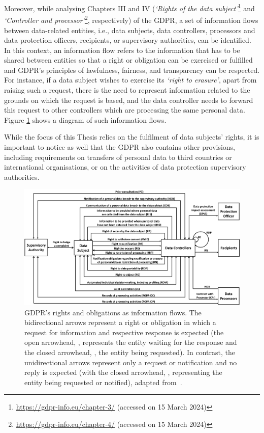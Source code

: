 Moreover, while analysing Chapters III and IV (\textit{`Rights of the data subject'}\footnote{\url{https://gdpr-info.eu/chapter-3/} (accessed on 15 March 2024)} and \textit{`Controller and processor'}\footnote{\url{https://gdpr-info.eu/chapter-4/} (accessed on 15 March 2024)}, respectively) of the GDPR, a set of information flows between data-related entities, i.e., data subjects, data controllers, processors and data protection officers, recipients, or supervisory authorities, can be identified.
In this context, an information flow refers to the information that has to be shared between entities so that a right or obligation can be exercised or fulfilled and GDPR's principles of lawfulness, fairness, and transparency can be respected.
For instance, if a data subject wishes to exercise its \textit{`right to erasure'}, apart from raising such a request, there is the need to represent information related to the grounds on which the request is based, and the data controller needs to forward this request to other controllers which are processing the same personal data.
Figure \ref{fig:gdpr_information_flows} shows a diagram of such information flows.

While the focus of this Thesis relies on the fulfilment of data subjects' rights, it is important to notice as well that the GDPR also contains other provisions, including requirements on transfers of personal data to third countries or international organisations, or on the activities of data protection supervisory authorities.

\begin{landscape}
\begin{figure}
    \centering
    \includegraphics[width=\linewidth]{figures/chapter-1/information flow diagram.png}
    \caption[GDPR's rights and obligations as information flows.]{GDPR's rights and obligations as information flows. The bidirectional arrows represent a right or obligation in which a request for information and respective response is expected (the open arrowhead, , represents the entity waiting for the response and the closed arrowhead, , the entity being requested). In contrast, the unidirectional arrows represent only a request or notification and no reply is expected (with the closed arrowhead, , representing the entity being requested or notified), adapted from~\cite{esteves_analysis_2022}.}
    \label{fig:gdpr_information_flows}
\end{figure}
\end{landscape}

